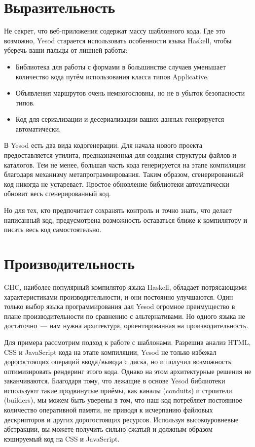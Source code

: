 \section{Выразительность}

Не секрет, что веб-приложения содержат массу шаблонного кода. Где это возможно, Yesod старается использовать особенности языка Haskell, чтобы уберечь ваши пальцы от лишней работы:

\begin{itemize}
  \item Библиотека для работы с формами в большинстве случаев уменьшает количество кода путём использования класса типов Applicative.
  \item Объявления маршрутов очень немногословны, но не в убыток безопасности типов.
  \item Код для сериализации и десериализации ваших данных генерируется автоматически.
\end{itemize}

В Yesod есть два вида кодогенерации. Для начала нового проекта предоставляется утилита, предназначенная для создания структуры файлов и каталогов. Тем не менее, большая часть кода генерируется на этапе компиляции благодаря механизму метапрограммирования. Таким образом, сгенерированный код никогда не устаревает. Простое обновление библиотеки автоматически обновит весь сгенерированный код.

Но для тех, кто предпочитает сохранять контроль и точно знать, что делает написанный код, предусмотрена возможность оставаться ближе к компилятору и писать весь код самостоятельно.

\section{Производительность}

GHC, наиболее популярный компилятор языка Haskell, обладает потрясающими характеристиками производительности, и они постоянно улучшаются. Один только выбор языка программирования дал Yesod огромное преимущество в плане производительности по сравнению с альтернативами. Но одного языка не достаточно~--- нам нужна архитектура, ориентированная на производительность.

Для примера рассмотрим подход к работе с шаблонами. Разрешив анализ HTML, CSS и JavaScript кода на этапе компиляции, Yesod не только избежал дорогостоящих операций ввода/вывода с диска, но и получил возможность оптимизировать рендеринг этого кода. Однако на этом архитектурные решения не заканчиваются. Благодаря тому, что лежащие в основе Yesod библиотеки используют такие продвинутые приёмы, как каналы (conduits) и строители (builders), мы можем быть уверены в том, что наш код потребляет постоянное количество оперативной памяти, не приводя к исчерпанию файловых дескрипторов и других дорогостоящих ресурсов. Используя высокоуровневые абстракции, вы можете получить сильно сжатый и должным образом кэшируемый код на CSS и JavaScript.

